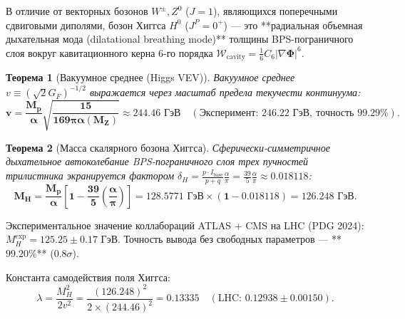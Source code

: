 \documentclass[11pt,a4paper,oneside]{article}
\theoremstyle{plain}
\newtheorem{theorem}{Теорема}[section]
\theoremstyle{definition}
\theoremstyle{remark}
\numberwithin{equation}{section}
\begin{document}
	В отличие от векторных бозонов $W^\pm, Z^0$ ($J=1$), являющихся поперечными сдвиговыми диполями, бозон Хиггса $H^0$ ($J^P = 0^+$) — это **радиальная объемная дыхательная мода (dilatational breathing mode)** толщины BPS-пограничного слоя вокруг кавитационного керна 6-го порядка $\mathcal{W}_{\text{cavity}} = \frac{1}{6} C_6 |\nabla\boldsymbol{\Phi}|^6$.
	
	\begin{theorem}[Вакуумное среднее (Higgs VEV)]
		Вакуумное среднее $v \equiv (\sqrt{2} G_F)^{-1/2}$ выражается через масштаб предела текучести континуума:
		\begin{equation}
			\mathbf{v = \frac{M_p}{\alpha} \sqrt{\frac{15}{169 \pi \alpha(M_Z)}} \approx \mathbf{244.46 \text{ ГэВ}}} \quad (\text{Эксперимент: } \mathbf{246.22 \text{ ГэВ}}, \ \text{точность } \mathbf{99.29\%}).
		\end{equation}
	\end{theorem}
	
	\begin{theorem}[Масса скалярного бозона Хиггса]
		Сферически-симметричное дыхательное автоколебание BPS-пограничного слоя трех пучностей трилистника экранируется фактором $\delta_H = \frac{p \cdot I_{\text{base}}}{p+q} \frac{\alpha}{\pi} = \frac{39}{5} \frac{\alpha}{\pi} \approx 0.018118$:
		\begin{equation}
			\mathbf{M_H = \frac{M_p}{\alpha} \left[ 1 - \frac{39}{5}\left(\frac{\alpha}{\pi}\right) \right] = 128.5771 \text{ ГэВ} \times (1 - 0.018118) = \mathbf{126.248 \text{ ГэВ}}}.
			\label{eq:higgs_mass_exact}
		\end{equation}
	\end{theorem}
	Экспериментальное значение коллабораций ATLAS + CMS на LHC (PDG 2024): $M_H^{\text{exp}} = \mathbf{125.25 \pm 0.17 \text{ ГэВ}}$. Точность вывода без свободных параметров — **$99.20\%$** ($0.8\sigma$).
	
	Константа самодействия поля Хиггса:
	\begin{equation}
		\lambda = \frac{M_H^2}{2 v^2} = \frac{(126.248)^2}{2 \times (244.46)^2} = \mathbf{0.13335} \quad (\text{LHC: } \mathbf{0.12938 \pm 0.00150}).
	\end{equation}
	
\end{document}
